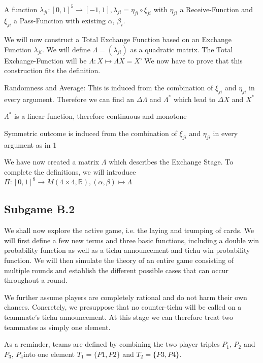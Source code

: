 \begin{definition}
A function $\lambda_{ji}: [0,1]^5 \to [-1,1], \lambda_{ji} = \eta_{ji} \circ \xi_{ji}$ with $\eta_{ji}$ a Receive-Function and $\xi_{ji}$ a Pass-Function with existing $\alpha$, $\beta_i$.
\end{definition}
\begin{remark}[Construction]
We will now construct a Total Exchange Function based on an Exchange Function $\lambda_{ji}$. We will define $\Lambda = (\lambda_{ji})$ as a quadratic matrix. 
The Total Exchange-Function will be $\Lambda: X \mapsto \Lambda X = X’$
We now have to prove that this construction fits the definition.
\begin{axioms}[(1)]
\item Randomness and Average: This is induced from the combination of $\xi_{ji}$ and $\eta_{ji}$ in every argument. Therefore we can find an $\Delta \Lambda$ and $\Lambda^* $ which lead to $\Delta X $ and 
$X^*$
\item $\Lambda^*$ is a linear function, therefore continuous and monotone
\item Symmetric outcome is induced from the combination of $\xi_{ji}$ and $\eta_{ji}$ in every argument as in 1
\end{axioms}
We have now created a matrix $\Lambda$ which describes the Exchange Stage. To complete the definitions, we will introduce $ \Pi : [0,1]^8 \to M(4 \times 4, \mathbb{R}), (\alpha, \beta) \mapsto \Lambda $
\end{remark}

\subsection{Subgame B.2}
We shall now explore the active game, i.e. the laying and trumping of cards. We will first define a few new terms and three basic functions, including a double win probability function as well as a tichu announcement and tichu win probability function. We will then simulate the theory of an entire game consisting of multiple rounds and establish the different possible cases that can occur throughout a round.

We further assume players are completely rational and do not harm their own chances. Concretely, we presuppose that no counter-tichu will be called on a teammate’s tichu announcement. At this stage we can therefore treat two teammates as simply one element.

As a reminder, teams are defined by combining the two player triples $P_1$, $P_2$ and $P_3$, $P_4$into one element $T_1 = \{P1,P2\}$ and $T_2 = \{P3,P4\}$.

